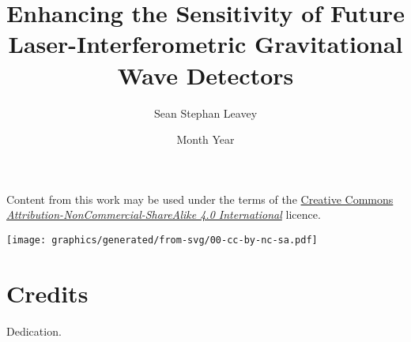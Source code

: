 \documentclass[twoside,nogutter]{glasgowthesis}
\begin{document}

\title{Enhancing the Sensitivity of Future Laser-Interferometric Gravitational Wave Detectors}
\author{Sean Stephan Leavey}
\date{Month Year}

\maketitle

\cleardoublepage


 

\newpage




\newpage
{}
\vspace*{2.75in}
\noindent Content from this work may be used under the terms of the \href{https://creativecommons.org/licenses/by-nc-sa/4.0/}{Creative Commons \emph{Attribution-NonCommercial-ShareAlike 4.0 International}} licence.
\begin{center}
  \texttt{[image: graphics/generated/from-svg/00-cc-by-nc-sa.pdf]}
\end{center}

\newpage
\renewcommand{\contentsname}{Table of contents}
\tableofcontents
{}

\listoftables
{}

\listoffigures
{}

\cleardoublepage
\section*{\label{c:intro:credits}Credits}


\cleardoublepage
{}
\vspace*{1.75in}
\begin{flushright} Dedication.\end{flushright}


\mainmatter









\appendix




\backmatter

\printglossary

\printbibliography[heading=bibintoc]
\end{document}

